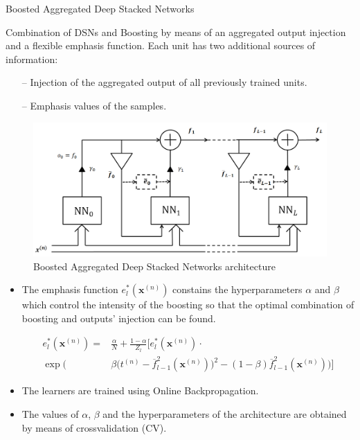 \documentclass[final,hyperref={pdfpagelabels=false}]{beamer}
\begin{document}
\begin{frame}[t]
\begin{columns}[t]
\begin{column}{.465\textwidth}
\begin{block}{	Boosted Aggregated Deep Stacked Networks}

Combination of DSNs and Boosting by means of an aggregated output injection and a flexible emphasis function. Each unit has two additional sources of information:

\begin{itemize}
\setlength{\itemindent}{2em}
\item[--] Injection of the aggregated output of all previously trained units.
\item[--] Emphasis values of the samples.
\end{itemize}

\begin{figure}
\includegraphics[width=0.8\linewidth]{BADSN1.png}
\caption{Boosted Aggregated Deep Stacked Networks architecture}
\end{figure}

\begin{itemize}
\item The emphasis function $e_{l}^*(\mathbf{x}^{(n)})$ constains the hyperparameters $\alpha$ and $\beta$ which control the intensity of the boosting so that the optimal combination of boosting and outputs' injection can be found.

\begin{equation}
\begin{split}
e_{l}^*(\mathbf{x}^{(n)}) = &\frac{\alpha }{N}  + \frac{1 - \alpha}{Z_{l}} \bigg[ e_{l}^* (\mathbf{x}^{(n)}) \cdot \\  
 \exp  \bigg( 
 & \beta \big( t^{(n)}- \overline{f}^{2}_{l-1} (\mathbf{x}^{(n)})\big)^2 - (1 - \beta)\overline{f}^{2}_{l-1} (\mathbf{x}^{(n)})   \bigg)\bigg] 
\end{split}
\end{equation}


\normalsize
\item The learners are trained using Online Backpropagation. 
\item The values of $\alpha$, $\beta$ and the hyperparameters of the architecture are obtained by means of crossvalidation (CV).


\end{itemize}
\end{block}
\end{column}
\end{columns}
\end{frame}
\end{document}
